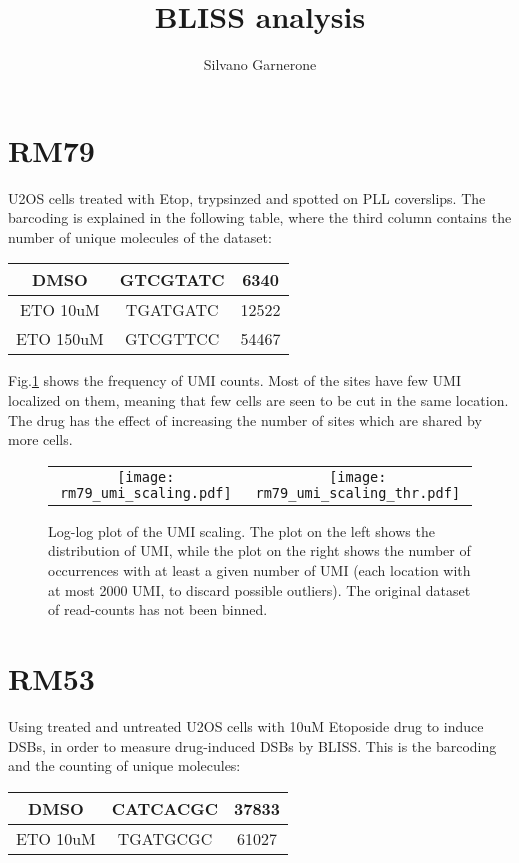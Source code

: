 \documentclass[11pt,a4paper]{article}
\author{Silvano Garnerone}
\title{BLISS analysis}
\begin{document}
\maketitle
\section{RM79}
U2OS cells treated with Etop, trypsinzed and spotted on PLL coverslips.
The barcoding is explained in the following table, where the third column contains the number of unique molecules of the dataset:

\begin{tabular}{|c|c|c|}
\hline 
DMSO & GTCGTATC & 6340\\ 
\hline 
ETO 10uM & TGATGATC & 12522\\ 
\hline 
ETO 150uM & GTCGTTCC & 54467 \\ 
\hline 
\end{tabular} 

Fig.\ref{fig:rm79_umi_stat} shows the frequency of UMI counts. Most of the sites 
have few UMI localized on them, meaning that few cells are seen to be cut in the same location. The drug has the effect of increasing the number of sites which 
are shared by more cells.
\begin{figure}[hbtp]
\centering
\begin{tabular}{@{}cc@{}}
  \texttt{[image: rm79\_umi\_scaling.pdf]} &
  \texttt{[image: rm79\_umi\_scaling\_thr.pdf]}
\end{tabular}
\caption{Log-log plot of the UMI scaling. The plot on the left shows the distribution of UMI, while the plot on the right shows the number of occurrences with at least a given number of UMI (each location with at most 2000 UMI, to discard possible outliers). The original dataset of read-counts has not been binned.}
\label{fig:rm79_umi_stat}
\end{figure}

\section{RM53}
Using treated and untreated U2OS cells with 10uM Etoposide drug to induce DSBs, in order to measure drug-induced DSBs by BLISS. This is the barcoding and the counting of unique molecules:

\begin{tabular}{|c|c|c|}
\hline 
DMSO & CATCACGC & 37833\\ 
\hline 
ETO 10uM & TGATGCGC & 61027\\ 
\hline 
\end{tabular} 
\end{document}
